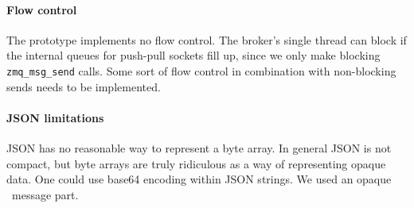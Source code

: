 \paragraph{Flow control}  The prototype implements no flow control.
The broker's single thread can block if the internal queues for push-pull
sockets fill up, since we only make blocking {\tt zmq\_msg\_send} calls.
Some sort of flow control in combination with non-blocking sends needs to
be implemented.

\paragraph{JSON limitations}  JSON has no reasonable way to represent
a byte array.  In general JSON is not compact, but byte arrays are truly
ridiculous as a way of representing opaque data.  One could use base64
encoding within JSON strings.  We used an opaque \zMQ\ message part.
